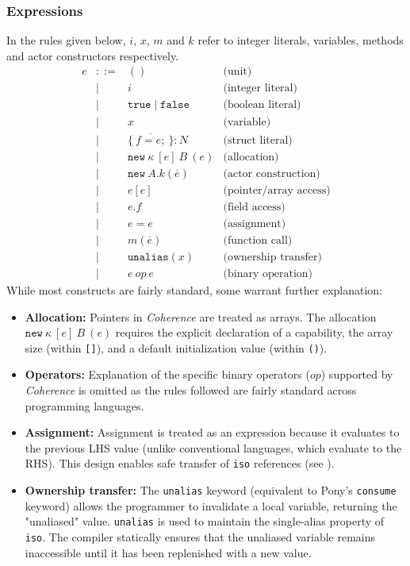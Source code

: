 \subsubsection*{Expressions}
In the rules given below, $i$, $x$, $m$ and $k$ refer to integer literals, variables, methods and actor constructors respectively.
\[
\begin{array}{lcll}
e & ::= & () & \text{(unit)} \\
  & \mid & i & \text{(integer literal)} \\
  & \mid & \mathtt{true} \mid \mathtt{false} & \text{(boolean literal)} \\
  & \mid & x & \text{(variable)} \\
  & \mid & \{\ \overline{f = e;}\ \} : N & \text{(struct literal)} \\
  & \mid & \mathtt{new}\ \kappa\ [e]\ B\ (e) & \text{(allocation)} \\
  & \mid & \mathtt{new}\ A.k(\overline{e}) & \text{(actor construction)} \\
  & \mid & e[e] & \text{(pointer/array access)} \\
  & \mid & e.f & \text{(field access)} \\
  & \mid & e = e & \text{(assignment)} \\
  & \mid & m(\overline{e}) & \text{(function call)} \\
  & \mid & \mathtt{unalias}(x) & \text{(ownership transfer)}\\
  & \mid & e\ \mathit{op}\ e & \text{(binary operation)}
\end{array}
\]
While most constructs are fairly standard, some warrant further explanation:
\begin{itemize}
    \item \textbf{Allocation:} Pointers in \textit{Coherence} are treated as arrays. The allocation $\mathtt{new}\ \kappa \ [e]\ B\ (e)$ requires the explicit declaration of a capability, the array size (within \texttt{[]}), and a default initialization value (within \texttt{()}). 
    \item \textbf{Operators:} Explanation of the specific binary operators ($\mathit{op}$) supported by \textit{Coherence} is omitted as the rules followed are fairly standard across programming languages.
    \item \textbf{Assignment:} Assignment is treated as an expression because it evaluates to the previous LHS value (unlike conventional languages, which evaluate to the RHS). This design enables safe transfer of \texttt{iso} references (see ).
    \item \textbf{Ownership transfer:} The \texttt{unalias} keyword (equivalent to Pony's \texttt{consume} keyword) allows the programmer to invalidate a local variable, returning the "unaliased" value. \texttt{unalias} is used to maintain the single-alias property of \texttt{iso}. The compiler statically ensures that the unaliased variable remains inaccessible until it has been replenished with a new value.
\end{itemize}
